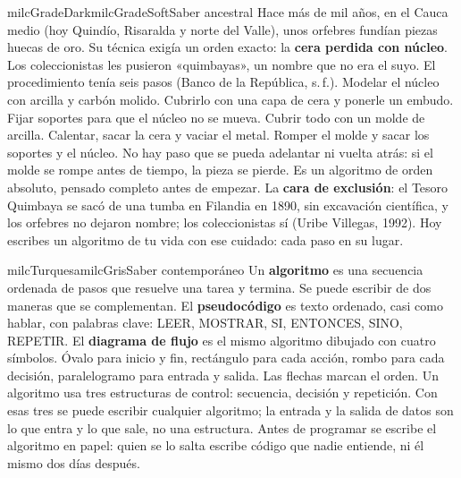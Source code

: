 \documentclass[11pt,letterpaper]{article}
\begin{document}
\begin{softbox}{milcGradeDark}{milcGradeSoft}{Saber ancestral}
Hace más de mil años, en el Cauca medio (hoy Quindío, Risaralda y norte del Valle), unos orfebres fundían piezas huecas de oro. Su técnica exigía un orden exacto: la \textbf{cera perdida con núcleo}. Los coleccionistas les pusieron «quimbayas», un nombre que no era el suyo. El procedimiento tenía seis pasos (Banco de la República, s.\,f.). Modelar el núcleo con arcilla y carbón molido. Cubrirlo con una capa de cera y ponerle un embudo. Fijar soportes para que el núcleo no se mueva. Cubrir todo con un molde de arcilla. Calentar, sacar la cera y vaciar el metal. Romper el molde y sacar los soportes y el núcleo. No hay paso que se pueda adelantar ni vuelta atrás: si el molde se rompe antes de tiempo, la pieza se pierde. Es un algoritmo de orden absoluto, pensado completo antes de empezar. La \textbf{cara de exclusión}: el Tesoro Quimbaya se sacó de una tumba en Filandia en 1890, sin excavación científica, y los orfebres no dejaron nombre; los coleccionistas sí (Uribe Villegas, 1992). Hoy escribes un algoritmo de tu vida con ese cuidado: cada paso en su lugar.\par{}
\end{softbox}

\begin{softbox}{milcTurquesa}{milcGris}{Saber contemporáneo}
Un \textbf{algoritmo} es una secuencia ordenada de pasos que resuelve una tarea y termina. Se puede escribir de dos maneras que se complementan. El \textbf{pseudocódigo} es texto ordenado, casi como hablar, con palabras clave: LEER, MOSTRAR, SI, ENTONCES, SINO, REPETIR. El \textbf{diagrama de flujo} es el mismo algoritmo dibujado con cuatro símbolos. Óvalo para inicio y fin, rectángulo para cada acción, rombo para cada decisión, paralelogramo para entrada y salida. Las flechas marcan el orden. Un algoritmo usa tres estructuras de control: secuencia, decisión y repetición. Con esas tres se puede escribir cualquier algoritmo; la entrada y la salida de datos son lo que entra y lo que sale, no una estructura. Antes de programar se escribe el algoritmo en papel: quien se lo salta escribe código que nadie entiende, ni él mismo dos días después.
\end{softbox}
\end{document}
